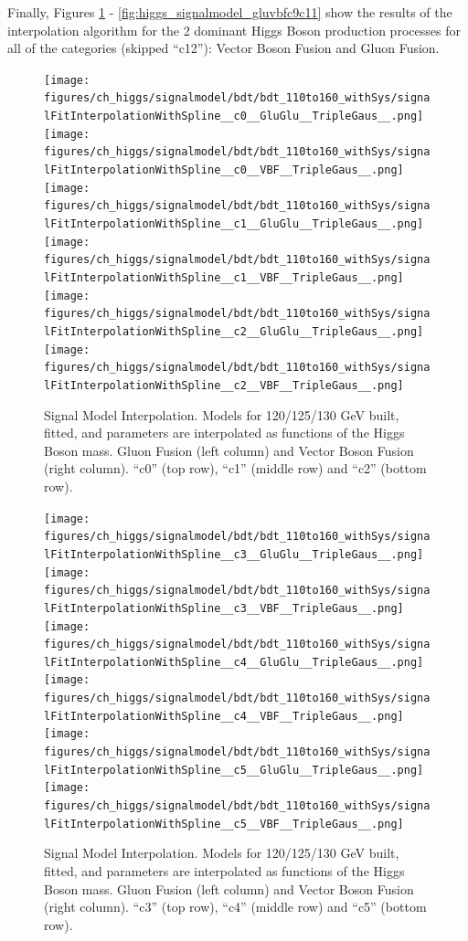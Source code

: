 Finally, Figures \ref{fig:higgs_signalmodel_gluvbfc0c2} - \ref{fig:higgs_signalmodel_gluvbfc9c11} show the results of the interpolation algorithm for the 2 dominant Higgs Boson production processes for all of the categories (skipped ``c12''): Vector Boson Fusion and Gluon Fusion.
\begin{figure}[htbp]
  \centering
  \texttt{[image: figures/ch\_higgs/signalmodel/bdt/bdt\_110to160\_withSys/signalFitInterpolationWithSpline\_\_c0\_\_GluGlu\_\_TripleGaus\_\_.png]}
  \texttt{[image: figures/ch\_higgs/signalmodel/bdt/bdt\_110to160\_withSys/signalFitInterpolationWithSpline\_\_c0\_\_VBF\_\_TripleGaus\_\_.png]}\\
  \texttt{[image: figures/ch\_higgs/signalmodel/bdt/bdt\_110to160\_withSys/signalFitInterpolationWithSpline\_\_c1\_\_GluGlu\_\_TripleGaus\_\_.png]}
  \texttt{[image: figures/ch\_higgs/signalmodel/bdt/bdt\_110to160\_withSys/signalFitInterpolationWithSpline\_\_c1\_\_VBF\_\_TripleGaus\_\_.png]}\\
  \texttt{[image: figures/ch\_higgs/signalmodel/bdt/bdt\_110to160\_withSys/signalFitInterpolationWithSpline\_\_c2\_\_GluGlu\_\_TripleGaus\_\_.png]}
  \texttt{[image: figures/ch\_higgs/signalmodel/bdt/bdt\_110to160\_withSys/signalFitInterpolationWithSpline\_\_c2\_\_VBF\_\_TripleGaus\_\_.png]}
  \caption{Signal Model Interpolation. Models for 120/125/130 GeV built, fitted, and parameters are interpolated as functions of the Higgs Boson mass. Gluon Fusion (left column) and Vector Boson Fusion (right column). ``c0'' (top row), ``c1'' (middle row) and ``c2'' (bottom row).}
  \label{fig:higgs_signalmodel_gluvbfc0c2}
\end{figure}
\begin{figure}[htbp]
  \centering
  \texttt{[image: figures/ch\_higgs/signalmodel/bdt/bdt\_110to160\_withSys/signalFitInterpolationWithSpline\_\_c3\_\_GluGlu\_\_TripleGaus\_\_.png]}
  \texttt{[image: figures/ch\_higgs/signalmodel/bdt/bdt\_110to160\_withSys/signalFitInterpolationWithSpline\_\_c3\_\_VBF\_\_TripleGaus\_\_.png]}\\
  \texttt{[image: figures/ch\_higgs/signalmodel/bdt/bdt\_110to160\_withSys/signalFitInterpolationWithSpline\_\_c4\_\_GluGlu\_\_TripleGaus\_\_.png]}
  \texttt{[image: figures/ch\_higgs/signalmodel/bdt/bdt\_110to160\_withSys/signalFitInterpolationWithSpline\_\_c4\_\_VBF\_\_TripleGaus\_\_.png]}\\
  \texttt{[image: figures/ch\_higgs/signalmodel/bdt/bdt\_110to160\_withSys/signalFitInterpolationWithSpline\_\_c5\_\_GluGlu\_\_TripleGaus\_\_.png]}
  \texttt{[image: figures/ch\_higgs/signalmodel/bdt/bdt\_110to160\_withSys/signalFitInterpolationWithSpline\_\_c5\_\_VBF\_\_TripleGaus\_\_.png]}
  \caption{Signal Model Interpolation. Models for 120/125/130 GeV built, fitted, and parameters are interpolated as functions of the Higgs Boson mass. Gluon Fusion (left column) and Vector Boson Fusion (right column). ``c3'' (top row), ``c4'' (middle row) and ``c5'' (bottom row).}
  \label{fig:higgs_signalmodel_gluvbfc3c5}
\end{figure}
